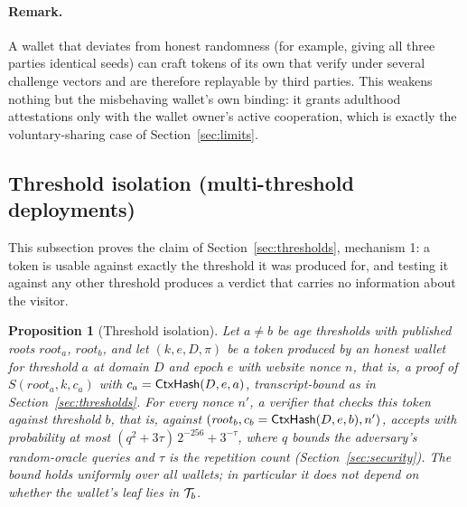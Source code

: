 \documentclass[11pt]{article}
\newtheorem{proposition}{Proposition}
\theoremstyle{definition}
\begin{document}
\paragraph{Remark.} A wallet that deviates from honest randomness (for example, giving all
three parties identical seeds) can craft tokens of its own that verify under several
challenge vectors and are therefore replayable by third parties. This weakens nothing but
the misbehaving wallet's own binding: it grants adulthood attestations only with the
wallet owner's active cooperation, which is exactly the voluntary-sharing case of
Section~\ref{sec:limits}.

\subsection{Threshold isolation (multi-threshold deployments)}
\label{sec:isolation}

This subsection proves the claim of Section~\ref{sec:thresholds}, mechanism 1: a token is
usable against exactly the threshold it was produced for, and testing it against any other
threshold produces a verdict that carries no information about the visitor.

\begin{proposition}[Threshold isolation]
\label{prop:isolation}
Let $a \ne b$ be age thresholds with published roots $\mathit{root}_a$, $\mathit{root}_b$,
and let $(k, e, D, \pi)$ be a token produced by an honest wallet for threshold $a$ at
domain $D$ and epoch $e$ with website nonce $n$, that is, a proof of $S(\mathit{root}_a,
k, c_a)$ with $c_a = \mathsf{CtxHash}(D, e, a)$, transcript-bound as in
Section~\ref{sec:thresholds}. For every nonce $n'$, a verifier that checks this token
against threshold $b$, that is, against $(\mathit{root}_b, c_b = \mathsf{CtxHash}(D, e, b), n')$,
accepts with probability at most $(q^2 + 3\tau)\,2^{-256} + 3^{-\tau}$, where $q$ bounds
the adversary's random-oracle queries and $\tau$ is the repetition count
(Section~\ref{sec:security}). The bound holds uniformly over all wallets; in particular
it does not depend on whether the wallet's leaf lies in $\mathcal{T}_b$.
\end{proposition}
\end{document}
